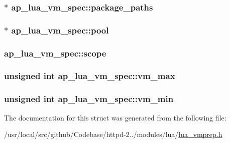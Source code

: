 \subsubsection[{\texorpdfstring{package\+\_\+paths}{package_paths}}]{$\ast$ ap\+\_\+lua\+\_\+vm\+\_\+spec\+::package\+\_\+paths}\hypertarget{structap__lua__vm__spec_a067b46ce0502fb803c6a45e7da635da2}{}\label{structap__lua__vm__spec_a067b46ce0502fb803c6a45e7da635da2}
\subsubsection[{\texorpdfstring{pool}{pool}}]{$\ast$ ap\+\_\+lua\+\_\+vm\+\_\+spec\+::pool}\hypertarget{structap__lua__vm__spec_a814452a7ae9ad93e886d0a062e3ae41e}{}\label{structap__lua__vm__spec_a814452a7ae9ad93e886d0a062e3ae41e}
\subsubsection[{\texorpdfstring{scope}{scope}}]{ ap\+\_\+lua\+\_\+vm\+\_\+spec\+::scope}\hypertarget{structap__lua__vm__spec_a3f48f62745598fabcf1715977f6e8d77}{}\label{structap__lua__vm__spec_a3f48f62745598fabcf1715977f6e8d77}
\subsubsection[{\texorpdfstring{vm\+\_\+max}{vm_max}}]{\setlength{\rightskip}{0pt plus 5cm}unsigned {\bf int} ap\+\_\+lua\+\_\+vm\+\_\+spec\+::vm\+\_\+max}\hypertarget{structap__lua__vm__spec_a0a68e82b1a4d6d6917fa2f7be29fb27e}{}\label{structap__lua__vm__spec_a0a68e82b1a4d6d6917fa2f7be29fb27e}
\subsubsection[{\texorpdfstring{vm\+\_\+min}{vm_min}}]{\setlength{\rightskip}{0pt plus 5cm}unsigned {\bf int} ap\+\_\+lua\+\_\+vm\+\_\+spec\+::vm\+\_\+min}\hypertarget{structap__lua__vm__spec_aa7a5fba22158814ea6771904bf5db7ce}{}\label{structap__lua__vm__spec_aa7a5fba22158814ea6771904bf5db7ce}


The documentation for this struct was generated from the following file\+:\begin{DoxyCompactItemize}
\item 
/usr/local/src/github/\+Codebase/httpd-\/2../modules/lua/\hyperlink{lua__vmprep_8h}{lua\+\_\+vmprep.\+h}\end{DoxyCompactItemize}
